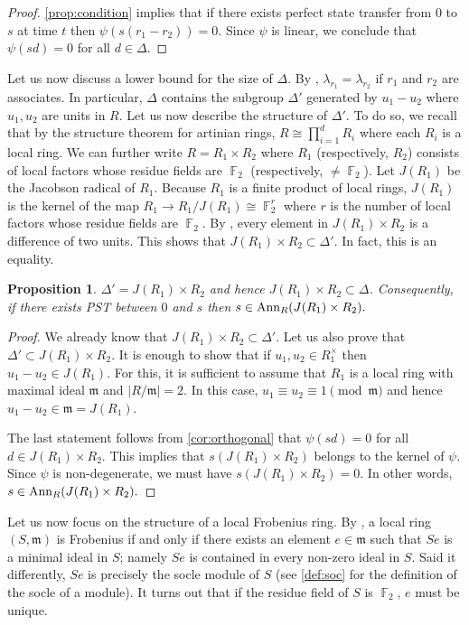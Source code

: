 \documentclass[12pt, a4paper]{amsart}
\newtheorem{prop}[thm]{Proposition}
\theoremstyle{definition}
\DeclareMathOperator{\F}{\mathbb{F}}
\newcommand{\Ann}{{\rm Ann}}
\numberwithin{equation}{section}
\begin{document}
\begin{proof}
\cref{prop:condition} implies that if there exists perfect state transfer from $0$ to $s$ at time $t$ then $\psi(s(r_1-r_2))=0.$ Since $\psi$ is linear, we conclude that $\psi(sd)=0$ for all $d \in \Delta.$
\end{proof}
Let us now discuss a lower bound for the size of $\Delta.$ By \cite[Corollary 4.17]{nguyen2025gcd}, $\lambda_{r_1}=\lambda_{r_2}$ if $r_1$ and $r_2$ are associates. In particular, $\Delta$ contains the subgroup $\Delta'$ generated by $u_1-u_2$ where $u_1, u_2$ are units in $R.$ Let us now describe the structure of $\Delta'.$ To do so, we recall that by the structure theorem for artinian rings, $R \cong \prod_{i=1}^d R_i$ where each $R_i$ is a local ring. We can further write $R=R_1 \times R_2$ where $R_1$ (respectively, $R_2$) consists of local factors whose residue fields are $\F_2$ (respectively, $\neq \F_2$). Let $J(R_1)$ be the Jacobson radical of $R_1$. Because $R_1$ is a finite product of local rings, $J(R_1)$ is the kernel of the map $R_1 \to R_1/J(R_1) \cong \F_2^r$ where $r$ is the number of local factors whose residue fields are $\F_2.$ By \cite[Corollary 3.5]{nguyen2025gcd}, every element in $J(R_1) \times R_2$ is a difference of two units. This shows that $J(R_1) \times R_2 \subset \Delta'$. In fact, this is an equality. 
\begin{prop} \label{prop:Delta}
$\Delta' = J(R_1) \times R_2$ and hence $J(R_1) \times R_2 \subset \Delta$. Consequently, if there exists PST between $0$ and $s$ then $s \in \Ann_{R}(J(R_1) \times R_2).$
\end{prop}
\begin{proof}
    We already know that $J(R_1) \times R_2 \subset \Delta'.$ Let us also prove that $\Delta' \subset J(R_1) \times R_2$. It is enough to show that if $u_1, u_2 \in R_{1}^{\times}$ then $u_1 - u_2 \in J(R_1).$ For this, it is sufficient to assume that $R_1$ is a local ring with maximal ideal $\mathfrak{m}$ and $|R/\mathfrak{m}|=2.$ In this case, $u_1 \equiv u_2 \equiv 1 \pmod{\mathfrak{m}}$ and hence $u_1- u_2 \in \mathfrak{m}=J(R_1).$

    The last statement follows from \cref{cor:orthogonal} that $\psi(sd)=0$ for all $d \in J(R_1) \times R_2.$ This implies that $s (J(R_1) \times R_2)$ belongs to the kernel of $\psi.$ Since $\psi$ is non-degenerate, we must have $s (J(R_1) \times R_2) = 0$. In other words, $s \in \Ann_{R}(J(R_1) \times R_2).$
\end{proof}

Let us now focus on the structure of a local Frobenius ring. By \cite{honold2001characterization, lamprecht1953allgemeine}, a local ring $(S,\mathfrak{m})$ is Frobenius if and only if there exists an element $e \in \mathfrak{m}$ such that $Se$ is a minimal ideal in $S$; namely $Se$ is contained in every non-zero ideal in $S$. Said it differently, $Se$ is precisely the socle module of $S$ (see \cref{def:soc} for the definition of the socle of a module). It turns out that if the residue field of $S$ is $\F_2$, $e$ must be unique. 
\end{document}
